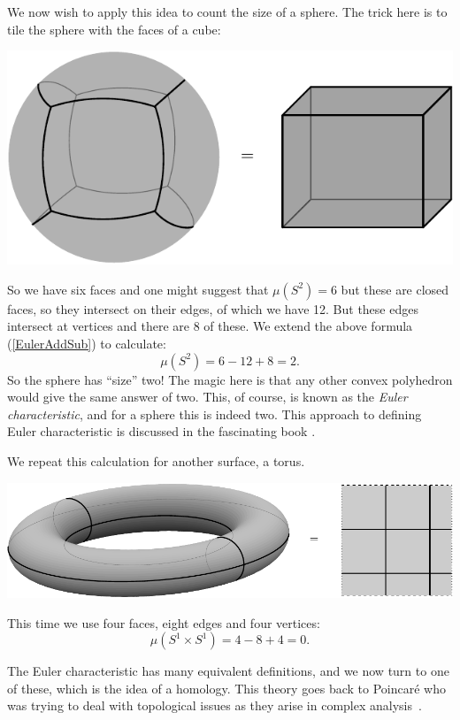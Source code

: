 \documentclass[11pt,twoside,openright]{report}
\newcommand{\Eref}[1]{(\ref{#1})}
\def\euler{\mu}
\begin{document}
We now wish to apply this idea to count the
size of a sphere. The trick here is to tile the
sphere with the faces of a cube:
\begin{center}
\includegraphics{pic-cube.pdf}
\end{center}
So we have six faces and one might suggest that 
$\euler(S^2)=6$ but these are closed faces, so they
intersect on their edges, of which we have 12.
But these edges intersect at vertices and there are
8 of these. 
We extend the above formula \Eref{EulerAddSub} to calculate:
$$
    \euler(S^2) = 6 - 12 + 8 = 2.
$$
So the sphere has ``size'' two!
The magic here is that any other convex polyhedron would give
the same answer of two.
This, of course, is known as the \emph{Euler characteristic},
and for a sphere this is indeed two.
{This approach to defining Euler characteristic is
discussed in the fascinating book \cite{Klain1997}.}

We repeat this calculation for another surface, a torus.
\begin{center}
\includegraphics[width=1.0\columnwidth]{pic-torus.pdf}
\end{center}
This time we use four faces, eight edges and four vertices:
$$
    \euler(S^1\times S^1) = 4 - 8 + 4 = 0.
$$

The Euler characteristic has many equivalent definitions,
and we now turn to one of these, which is the idea of a homology.
This theory goes back to Poincar\'e who was trying to
deal with topological issues as they arise in complex analysis~\cite{Lefschetz1970}.
\end{document}
